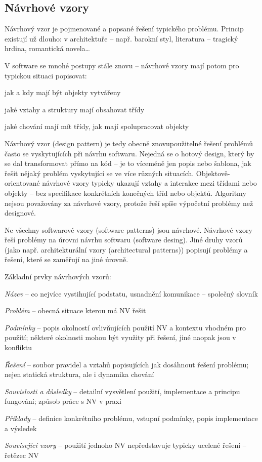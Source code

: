 \subsection{Návrhové vzory}

Návrhový vzor je pojmenované a popsané řešení typického problému. Princip existují už dlouho: v architektuře -- např. barokní styl, literatura -- tragický hrdina, romantická novela\dots

V software se mnohé postupy  stále znovu -- návrhové vzory mají potom pro typickou situaci popisovat:
\begin{pitemize}
	\item jak a kdy mají být objekty vytvářeny
	\item jaké vztahy a struktury mají obsahovat třídy
	\item jaké chování mají mít třídy, jak mají spolupracovat objekty
\end{pitemize}

Návrhový vzor (design pattern) je tedy obecně znovupoužitelné řešení problémů často se vyskytujících při návrhu softwaru. Nejedná se o hotový design, který by se dal transformovat přímo na kód -- je to víceméně jen popis nebo šablona, jak řešit nějaký problém vyskytující se ve více různých situacích. Objektově-orientované návrhové vzory typicky ukazují vztahy a interakce mezi třídami nebo objekty -- bez specifikace konkrétních konečných tříd nebo objektů. Algoritmy nejsou považovány za návrhové vzory, protože řeší spíše výpočetní problémy než designové.

Ne všechny softwarové vzory (software patterns) jsou návrhové. Návrhové vzory řeší problémy na úrovni návrhu softwaru (software desing). Jiné druhy vzorů (jako např. architekturální vzory (architectural patterns)) popisují problémy a řešení, které se zaměřují na jiné úrovně.

Základní prvky návrhových vzorů:
\begin{pitemize}
	\item \emph{Název} -- co nejvíce vystihující podstatu, usnadnění komunikace -- společný slovník
	\item \emph{Problém} -- obecná situace kterou má NV řešit
	\item \emph{Podmínky} -- popis okolností ovlivňujících použití NV a kontextu vhodném pro použití; některé okolnosti mohou být využity při řešení, jiné naopak jsou v konfliktu
	\item \emph{Řešení} -- soubor pravidel a vztahů popisujících jak dosáhnout řešení problému; nejen statická struktura, ale i dynamika chování
	\item \emph{Souvislosti a důsledky} -- detailní vysvětlení použití, implementace a principu fungování; způsob práce s NV v praxi
	\item \emph{Příklady} -- definice konkrétního problému, vstupní podmínky, popis implementace a výsledek
	\item \emph{Související vzory} -- použití jednoho NV nepředstavuje typicky ucelené řešení -- řetězec NV
\end{pitemize}

